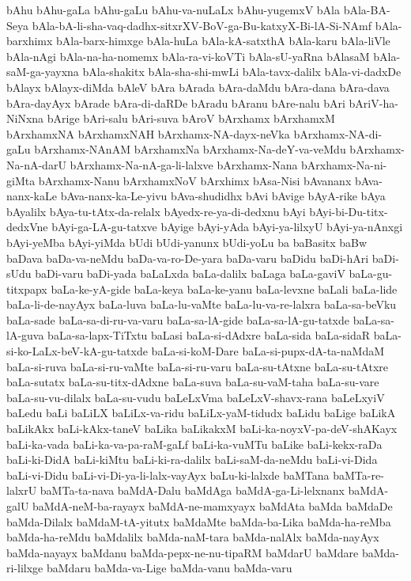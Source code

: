 {bAhu
bAhu-gaLa
bAhu-gaLu
bAhu-va-nuLaLx
bAhu-yugemxV
bAla
bAla-BA-Seya
bAla-bA-li-sha-vaq-dadhx-sitxrXV-BoV-ga-Bu-katxyX-Bi-lA-Si-NAmf
bAla-barxhimx
bAla-barx-himxge
bAla-huLa
bAla-kA-satxthA
bAla-karu
bAla-liVle
bAla-nAgi
bAla-na-ha-nomemx
bAla-ra-vi-koVTi
bAla-sU-yaRna
bAlasaM
bAla-saM-ga-yayxna
bAla-shakitx
bAla-sha-shi-mwLi
bAla-tavx-dalilx
bAla-vi-dadxDe
bAlayx
bAlayx-diMda
bAleV
bAra
bArada
bAra-daMdu
bAra-dana
bAra-dava
bAra-dayAyx
bArade
bAra-di-daRDe
bAradu
bAranu
bAre-nalu
bAri
bAriV-ha-NiNxna
bArige
bAri-salu
bAri-suva
bAroV
bArxhamx
bArxhamxM
bArxhamxNA
bArxhamxNAH
bArxhamx-NA-dayx-neVka
bArxhamx-NA-di-gaLu
bArxhamx-NAnAM
bArxhamxNa
bArxhamx-Na-deY-va-veMdu
bArxhamx-Na-nA-darU
bArxhamx-Na-nA-ga-li-lalxve
bArxhamx-Nana
bArxhamx-Na-ni-giMta
bArxhamx-Nanu
bArxhamxNoV
bArxhimx
bAsa-Nisi
bAvananx
bAva-nanx-kaLe
bAva-nanx-ka-Le-yivu
bAva-shudidhx
bAvi
bAvige
bAyA-rike
bAya
bAyalilx
bAya-tu-tAtx-da-relalx
bAyedx-re-ya-di-dedxnu
bAyi
bAyi-bi-Du-titx-dedxVne
bAyi-ga-LA-gu-tatxve
bAyige
bAyi-yAda
bAyi-ya-lilxyU
bAyi-ya-nAnxgi
bAyi-yeMba
bAyi-yiMda
bUdi
bUdi-yanunx
bUdi-yoLu
ba
baBasitx
baBw
baDava
baDa-va-neMdu
baDa-va-ro-De-yara
baDa-varu
baDidu
baDi-hAri
baDi-sUdu
baDi-varu
baDi-yada
baLaLxda
baLa-dalilx
baLaga
baLa-gaviV
baLa-gu-titxpapx
baLa-ke-yA-gide
baLa-keya
baLa-ke-yanu
baLa-levxne
baLali
baLa-lide
baLa-li-de-nayAyx
baLa-luva
baLa-lu-vaMte
baLa-lu-va-re-lalxra
baLa-sa-beVku
baLa-sade
baLa-sa-di-ru-va-varu
baLa-sa-lA-gide
baLa-sa-lA-gu-tatxde
baLa-sa-lA-guva
baLa-sa-lapx-TiTxtu
baLasi
baLa-si-dAdxre
baLa-sida
baLa-sidaR
baLa-si-ko-LaLx-beV-kA-gu-tatxde
baLa-si-koM-Dare
baLa-si-pupx-dA-ta-naMdaM
baLa-si-ruva
baLa-si-ru-vaMte
baLa-si-ru-varu
baLa-su-tAtxne
baLa-su-tAtxre
baLa-sutatx
baLa-su-titx-dAdxne
baLa-suva
baLa-su-vaM-taha
baLa-su-vare
baLa-su-vu-dilalx
baLa-su-vudu
baLeLxVma
baLeLxV-shavx-rana
baLeLxyiV
baLedu
baLi
baLiLX
baLiLx-va-ridu
baLiLx-yaM-tidudx
baLidu
baLige
baLikA
baLikAkx
baLi-kAkx-taneV
baLika
baLikakxM
baLi-ka-noyxV-pa-deV-shAKayx
baLi-ka-vada
baLi-ka-va-pa-raM-gaLf
baLi-ka-vuMTu
baLike
baLi-kekx-raDa
baLi-ki-DidA
baLi-kiMtu
baLi-ki-ra-dalilx
baLi-saM-da-neMdu
baLi-vi-Dida
baLi-vi-Didu
baLi-vi-Di-ya-li-lalx-vayAyx
baLu-ki-lalxde
baMTana
baMTa-re-lalxrU
baMTa-ta-nava
baMdA-Dalu
baMdAga
baMdA-ga-Li-lelxnanx
baMdA-galU
baMdA-neM-ba-rayayx
baMdA-ne-mamxyayx
baMdAta
baMda
baMdaDe
baMda-Dilalx
baMdaM-tA-yitutx
baMdaMte
baMda-ba-Lika
baMda-ha-reMba
baMda-ha-reMdu
baMdalilx
baMda-naM-tara
baMda-nalAlx
baMda-nayAyx
baMda-nayayx
baMdanu
baMda-pepx-ne-nu-tipaRM
baMdarU
baMdare
baMda-ri-lilxge
baMdaru
baMda-va-Lige
baMda-vanu
baMda-varu
}
